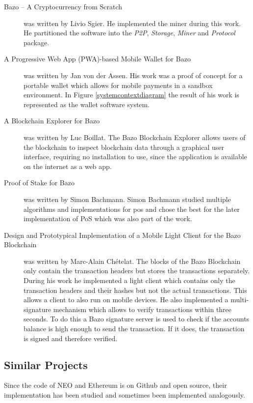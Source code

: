 \begin{description}
	\item [Bazo – A Cryptocurrency from Scratch \cite{ba_miner}] was written by Livio Sgier. He implemented the miner during this work. He partitioned the software into the \textit{P2P}, \textit{Storage}, \textit{Miner} and \textit{Protocol} package.
	\item [A Progressive Web App (PWA)-based Mobile Wallet for Bazo \cite{ba_wallet}] was written by Jan von der Assen. His work was a proof of concept for a portable wallet which allows for mobile payments in a sandbox environment. In Figure \ref{systemcontextdiagram} the result of his work is represented as the wallet software system.
	\item [A Blockchain Explorer for Bazo \cite{ba_explorer}] was written by Luc Boillat. The Bazo Blockchain Explorer allows users of the blockchain to inspect blockchain data through a graphical user interface, requiring no installation to use, since the application is available on the internet as a web app. \cite{ba_explorer}
	\item [Proof of Stake for Bazo \cite{ba_pos}] was written by Simon Bachmann. Simon Bachmann studied multiple algorithms and implementations for \Gls{pos} and chose the best for the later implementation of PoS which was also part of the work.
	\item [Design and Prototypical Implementation of a Mobile Light Client for the Bazo Blockchain \cite{ba_client}] was written by Marc-Alain Chételat. The blocks of the Bazo Blockchain only contain the transaction headers but stores the transactions separately. During his work he implemented a light client which contains only the transaction headers and their hashes but not the actual transactions. This allows a client to also run on mobile devices. He also 	implemented a multi-signature mechanism which allows to verify transactions within three seconds.  To do this a Bazo signature server is used to check if the accounts balance is high enough to send the transaction. If it does, the transaction is signed and therefore verified. 
\end{description}

\subsection{Similar Projects}
Since the code of NEO and Ethereum is on Github and open source, their implementation has been studied and sometimes been implemented analogously. 

